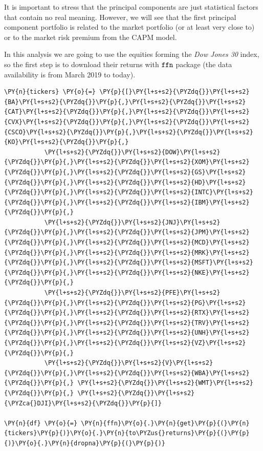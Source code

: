 It is important to stress that the principal components are just
statistical factors that contain no real meaning. However, we will see
that the first principal component portfolio is related to the market
portfolio (or at least very close to) or to the market risk premium 
from the CAPM model.

In this analysis we are going to use the equities forming the
\emph{Dow Jones 30} index, so the first step is to download their
returns with \(\tt{ffn}\) package (the data availability is from March
2019 to today).
	
\begin{codebox}
\begin{Verbatim}[commandchars=\\\{\}]
\PY{n}{tickers} \PY{o}{=} \PY{p}{[}\PY{l+s+s2}{\PYZdq{}}\PY{l+s+s2}{BA}\PY{l+s+s2}{\PYZdq{}}\PY{p}{,}\PY{l+s+s2}{\PYZdq{}}\PY{l+s+s2}{CAT}\PY{l+s+s2}{\PYZdq{}}\PY{p}{,}\PY{l+s+s2}{\PYZdq{}}\PY{l+s+s2}{CVX}\PY{l+s+s2}{\PYZdq{}}\PY{p}{,}\PY{l+s+s2}{\PYZdq{}}\PY{l+s+s2}{CSCO}\PY{l+s+s2}{\PYZdq{}}\PY{p}{,}\PY{l+s+s2}{\PYZdq{}}\PY{l+s+s2}{KO}\PY{l+s+s2}{\PYZdq{}}\PY{p}{,}
           \PY{l+s+s2}{\PYZdq{}}\PY{l+s+s2}{DOW}\PY{l+s+s2}{\PYZdq{}}\PY{p}{,}\PY{l+s+s2}{\PYZdq{}}\PY{l+s+s2}{XOM}\PY{l+s+s2}{\PYZdq{}}\PY{p}{,}\PY{l+s+s2}{\PYZdq{}}\PY{l+s+s2}{GS}\PY{l+s+s2}{\PYZdq{}}\PY{p}{,}\PY{l+s+s2}{\PYZdq{}}\PY{l+s+s2}{HD}\PY{l+s+s2}{\PYZdq{}}\PY{p}{,}\PY{l+s+s2}{\PYZdq{}}\PY{l+s+s2}{INTC}\PY{l+s+s2}{\PYZdq{}}\PY{p}{,}\PY{l+s+s2}{\PYZdq{}}\PY{l+s+s2}{IBM}\PY{l+s+s2}{\PYZdq{}}\PY{p}{,}
           \PY{l+s+s2}{\PYZdq{}}\PY{l+s+s2}{JNJ}\PY{l+s+s2}{\PYZdq{}}\PY{p}{,}\PY{l+s+s2}{\PYZdq{}}\PY{l+s+s2}{JPM}\PY{l+s+s2}{\PYZdq{}}\PY{p}{,}\PY{l+s+s2}{\PYZdq{}}\PY{l+s+s2}{MCD}\PY{l+s+s2}{\PYZdq{}}\PY{p}{,}\PY{l+s+s2}{\PYZdq{}}\PY{l+s+s2}{MRK}\PY{l+s+s2}{\PYZdq{}}\PY{p}{,}\PY{l+s+s2}{\PYZdq{}}\PY{l+s+s2}{MSFT}\PY{l+s+s2}{\PYZdq{}}\PY{p}{,}\PY{l+s+s2}{\PYZdq{}}\PY{l+s+s2}{NKE}\PY{l+s+s2}{\PYZdq{}}\PY{p}{,}
           \PY{l+s+s2}{\PYZdq{}}\PY{l+s+s2}{PFE}\PY{l+s+s2}{\PYZdq{}}\PY{p}{,}\PY{l+s+s2}{\PYZdq{}}\PY{l+s+s2}{PG}\PY{l+s+s2}{\PYZdq{}}\PY{p}{,}\PY{l+s+s2}{\PYZdq{}}\PY{l+s+s2}{RTX}\PY{l+s+s2}{\PYZdq{}}\PY{p}{,}\PY{l+s+s2}{\PYZdq{}}\PY{l+s+s2}{TRV}\PY{l+s+s2}{\PYZdq{}}\PY{p}{,}\PY{l+s+s2}{\PYZdq{}}\PY{l+s+s2}{UNH}\PY{l+s+s2}{\PYZdq{}}\PY{p}{,}\PY{l+s+s2}{\PYZdq{}}\PY{l+s+s2}{VZ}\PY{l+s+s2}{\PYZdq{}}\PY{p}{,}
           \PY{l+s+s2}{\PYZdq{}}\PY{l+s+s2}{V}\PY{l+s+s2}{\PYZdq{}}\PY{p}{,}\PY{l+s+s2}{\PYZdq{}}\PY{l+s+s2}{WBA}\PY{l+s+s2}{\PYZdq{}}\PY{p}{,} \PY{l+s+s2}{\PYZdq{}}\PY{l+s+s2}{WMT}\PY{l+s+s2}{\PYZdq{}}\PY{p}{,} \PY{l+s+s2}{\PYZdq{}}\PY{l+s+s2}{\PYZca{}DJI}\PY{l+s+s2}{\PYZdq{}}\PY{p}{]}
		
\PY{n}{df} \PY{o}{=} \PY{n}{ffn}\PY{o}{.}\PY{n}{get}\PY{p}{(}\PY{n}{tickers}\PY{p}{)}\PY{o}{.}\PY{n}{to\PYZus{}returns}\PY{p}{(}\PY{p}{)}\PY{o}{.}\PY{n}{dropna}\PY{p}{(}\PY{p}{)}
\end{Verbatim}
\end{codebox}
	
